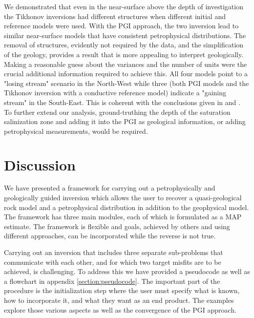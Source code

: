 \documentclass[extra]{gji} %
\begin{document}
We demonstrated that even in the near-surface above the depth of investigation the Tikhonov inversions had different structures when different initial and reference models were used. With the PGI approach, the two inversion lead to similar near-surface models that have consistent petrophysical distributions. The removal of structures, evidently not required by the data, and the simplification of the geology, provides a result that is more appealing to interpret geologically. Making a reasonable guess about the variances and the number of units were the crucial additional information required to achieve this. All four models point to a "losing stream" scenario in the North-West while three (both PGI models and the Tikhonov inversion with a conductive reference model) indicate a "gaining stream" in the South-East. This is coherent with the conclusions given in \cite{Bookpurnong,viezzoli2010} and \cite{Yang2017}. To further extend our analysis, ground-truthing the depth of the saturation salinization zone and adding it into the PGI as geological information, or adding petrophysical measurements, would be required.

\section{Discussion}

We have presented a framework for carrying out a petrophysically and geologically guided inversion which allows the user to recover a quasi-geological rock model \citep{QuasiGeologicalModel} and a petrophysical distribution in addition to the geophysical model. The framework has three main modules, each of which is formulated as a MAP estimate. The framework is flexible and goals, achieved by others and using different approaches, can be incorporated while the reverse is not true.

Carrying out an inversion that includes three separate sub-problems that communicate with each other, and for which two target misfits are to be achieved, is challenging. To address this we have provided a pseudocode as well as a flowchart in appendix \ref{section:pseudocode}. The important part of the procedure is the initialization step where the user must specify what is known, how to incorporate it, and what they want as an end product. The examples explore those various aspects as well as the convergence of the PGI approach.
\end{document}
